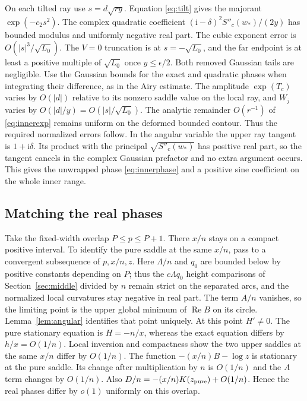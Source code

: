 \documentclass[11pt]{article}
\DeclareMathOperator{\Rea}{Re}
\newcommand{\ii}{\mathrm i}
\begin{document}
On each tilted ray use \(s=d\sqrt{r y}\). Equation \eqref{eq:tilt} gives the majorant \(\exp(-c_2s^2)\). The complex quadratic coefficient \((\ii-\delta)^2 S''_c(w_*)/(2y)\) has bounded modulus and uniformly negative real part. The cubic exponent error is \(O(|s|^3/\sqrt{L_0})\). The \(V=0\) truncation is at \(s=-\sqrt{L_0}\), and the far endpoint is at least a positive multiple of \(\sqrt{L_0}\) once \(y\le\epsilon/2\). Both removed Gaussian tails are negligible. Use the Gaussian bounds for the exact and quadratic phases when integrating their difference, as in the Airy estimate. The amplitude \(\exp(T_c)\) varies by \(O(|d|)\) relative to its nonzero saddle value on the local ray, and \(W_j\) varies by \(O(|d|/y)=O(|s|/\sqrt{L_0})\). The analytic remainder \(O(r^{-1})\) of \eqref{eq:innerexp} remains uniform on the deformed bounded contour. Thus the required normalized errors follow. In the angular variable the upper ray tangent is \(1+\ii\delta\). Its product with the principal \(\sqrt{S''_c(w_*)}\) has positive real part, so the tangent cancels in the complex Gaussian prefactor and no extra argument occurs. This gives the unwrapped phase \eqref{eq:innerphase} and a positive sine coefficient on the whole inner range.

\subsection{Matching the real phases}\label{sec:match}
Take the fixed-width overlap \(P\le p\le P+1\). There \(x/n\) stays on a compact positive interval. To identify the pure saddle at the same \(x/n\), pass to a convergent subsequence of \(p,x/n,z\). Here \(\Lambda/n\) and \(q_0\) are bounded below by positive constants depending on \(P\); thus the \(c\Lambda q_0\) height comparisons of Section~\ref{sec:middle} divided by \(n\) remain strict on the separated arcs, and the normalized local curvatures stay negative in real part. The term \(A/n\) vanishes, so the limiting point is the upper global minimum of \(\Rea B\) on its circle. Lemma~\ref{lem:angular} identifies that point uniquely. At this point \(H'\ne0\). The pure stationary equation is \(H=-n/x\), whereas the exact equation differs by \(h/x=O(1/n)\). Local inversion and compactness show the two upper saddles at the same \(x/n\) differ by \(O(1/n)\). The function \(-(x/n)B-\log z\) is stationary at the pure saddle. Its change after multiplication by \(n\) is \(O(1/n)\) and the \(A\) term changes by \(O(1/n)\). Also \(D/n=-(x/n)K(z_{\rm pure})+O(1/n)\). Hence the real phases differ by \(o(1)\) uniformly on this overlap.
\end{document}
